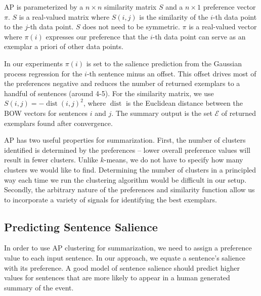 \documentclass{sig-alternate} \usepackage{url} \usepackage{color}
\begin{document}
AP is parameterized by a $n\times n$ similarity matrix $S$ and a $n\times 1$
preference vector $\pi$.  $S$ is a real-valued matrix where $S(i,j)$ is the
similarity of the $i$-th data point to the $j$-th data point.  $S$ does not
need to be symmetric.  $\pi$ is a real-valued vector where $\pi(i)$ expresses
our preference that the $i$-th data point can serve as an exemplar a priori of
other data points. 

In our experiments $\pi(i)$ is set to the salience prediction from the
Gaussian process regression for the $i$-th sentence minus an offset. This
offset drives most of the preferences negative and reduces the number of
returned exemplars to a handful of sentences (around 4-5).  For the similarity
matrix, we use $S(i,j) = -\operatorname{dist}(i,j)^2$, where
$\operatorname{dist}$ is the Euclidean distance between the BOW vectors for
sentences $i$ and $j$.
The summary output is the set $\mathcal{E}$ of returned exemplars found after
convergence.







AP has two useful properties for summarization. First, the number of clusters
identified is determined by the preferences -- lower overall preference
values  will result in fewer clusters. Unlike $k$-means, we do not have to
specify how many clusters we would like to find.  Determining the number of
clusters in a principled way each time we run the clustering algorithm would
be difficult in our setup.  Secondly, the arbitrary nature of the preferences
and similarity function allow us to incorporate a variety of signals for
identifying the best exemplars. 


\subsection{Predicting Sentence Salience}

In order to use AP clustering for summarization, we need to assign a
preference value to each input sentence.  In our approach, we equate a
sentence's salience with its preference.  A good model of sentence salience
should predict higher values for sentences that are more likely to appear in a
human generated summary of the event.
\end{document}
